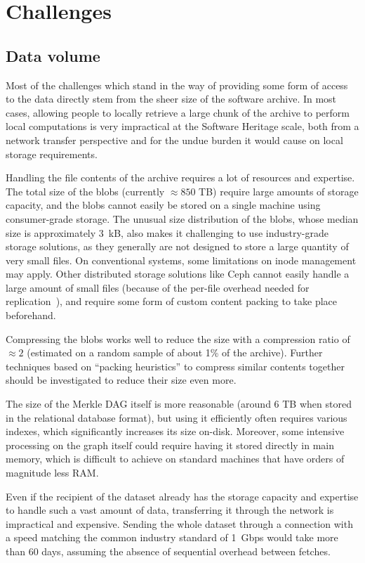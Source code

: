 \section{Challenges}

\subsection{Data volume}

Most of the challenges which stand in the way of providing some form of access
to the data directly stem from the sheer size of the software archive. In most
cases, allowing people to locally retrieve a large chunk of the archive to
perform local computations is very impractical at the Software Heritage scale,
both from a network transfer perspective and for the undue burden it would
cause on local storage requirements.

Handling the file contents of the archive requires a lot of resources and
expertise. The total size of the blobs (currently $\approx 850$ TB) require
large amounts of storage capacity, and the blobs cannot easily be stored on a
single machine using consumer-grade storage. The unusual size distribution of
the blobs, whose median size is approximately 3~kB, also makes it challenging
to use industry-grade storage solutions, as they generally are not designed to
store a large quantity of very small files. On conventional systems, some
limitations on inode management may apply. Other distributed storage solutions
like Ceph cannot easily handle a large amount of small files (because of the
per-file overhead needed for replication~\cite{dandrimont2018cephml}), and
require some form of custom content packing to take place beforehand.

Compressing the blobs works well to reduce the size with a compression
ratio of $\approx 2$ (estimated on a random sample of about 1\% of the
archive). Further techniques based on ``packing heuristics'' to compress
similar contents together should be investigated to reduce their size even
more.

The size of the Merkle DAG itself is more reasonable (around 6 TB when stored
in the relational database format), but using it efficiently often requires
various indexes, which significantly increases its size on-disk.  Moreover,
some intensive processing on the graph itself could require having it stored
directly in main memory, which is difficult to achieve on standard machines
that have orders of magnitude less RAM\@.

Even if the recipient of the dataset already has the storage capacity and
expertise to handle such a vast amount of data, transferring it through the
network is impractical and expensive. Sending the whole dataset through a
connection with a speed matching the common industry standard of 1~Gbps would
take more than 60 days, assuming the absence of sequential overhead between
fetches.

